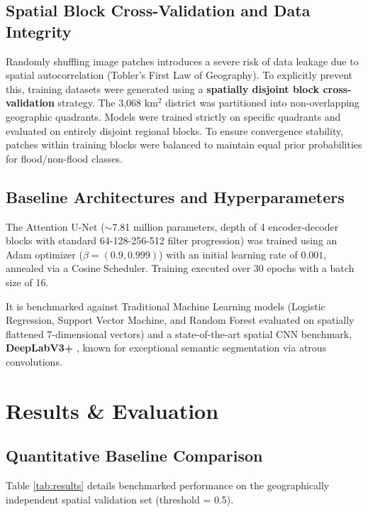 \documentclass[conference]{IEEEtran}
\begin{document}
\subsection{Spatial Block Cross-Validation and Data Integrity}
Randomly shuffling image patches introduces a severe risk of data leakage due to spatial autocorrelation (Tobler's First Law of Geography). To explicitly prevent this, training datasets were generated using a \textbf{spatially disjoint block cross-validation} strategy. The 3,068 km$^2$ district was partitioned into non-overlapping geographic quadrants. Models were trained strictly on specific quadrants and evaluated on entirely disjoint regional blocks. To ensure convergence stability, patches within training blocks were balanced to maintain equal prior probabilities for flood/non-flood classes.

\subsection{Baseline Architectures and Hyperparameters}
The Attention U-Net ($\sim$7.81 million parameters, depth of 4 encoder-decoder blocks with standard 64-128-256-512 filter progression) was trained using an Adam optimizer ($\beta=(0.9, 0.999)$) with an initial learning rate of $0.001$, annealed via a Cosine Scheduler. Training executed over 30 epochs with a batch size of 16.

It is benchmarked against Traditional Machine Learning models (Logistic Regression, Support Vector Machine, and Random Forest evaluated on spatially flattened 7-dimensional vectors) and a state-of-the-art spatial CNN benchmark, \textbf{DeepLabV3+} \cite{18}, known for exceptional semantic segmentation via atrous convolutions.

\section{Results \& Evaluation}

\subsection{Quantitative Baseline Comparison}
Table \ref{tab:results} details benchmarked performance on the geographically independent spatial validation set (threshold = 0.5).
\end{document}
